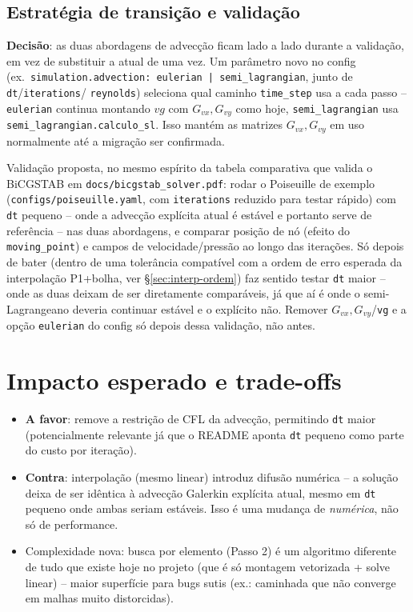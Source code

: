 \documentclass[11pt,a4paper]{article}
\begin{document}
\subsection{Estratégia de transição e validação}
\label{sec:transicao}

\textbf{Decisão}: as duas abordagens de advecção ficam lado a lado
durante a validação, em vez de substituir a atual de uma vez. Um
parâmetro novo no config (ex.\ \texttt{simulation.advection: eulerian
| semi\_lagrangian}, junto de \texttt{dt}/\texttt{iterations}/
\texttt{reynolds}) seleciona qual caminho \texttt{time\_step} usa a
cada passo -- \texttt{eulerian} continua montando $vg$ com $G_{vx},
G_{vy}$ como hoje, \texttt{semi\_lagrangian} usa
\texttt{semi\_lagrangian.calculo\_sl}. Isso mantém as
matrizes $G_{vx}, G_{vy}$ em uso normalmente até a migração ser
confirmada.

Validação proposta, no mesmo espírito da tabela comparativa que
valida o BiCGSTAB em \texttt{docs/bicgstab\_solver.pdf}: rodar o
Poiseuille de exemplo (\texttt{configs/poiseuille.yaml}, com
\texttt{iterations} reduzido para testar rápido) com \texttt{dt}
pequeno -- onde a advecção explícita atual é estável e portanto serve
de referência -- nas duas abordagens, e comparar posição de nó
(efeito do \texttt{moving\_point}) e campos de velocidade/pressão ao
longo das iterações. Só depois de bater (dentro de uma tolerância
compatível com a ordem de erro esperada da interpolação P1+bolha, ver
\S\ref{sec:interp-ordem}) faz sentido testar \texttt{dt} maior -- onde
as duas deixam de ser diretamente comparáveis, já que aí é onde o
semi-Lagrangeano deveria continuar estável e o explícito não. Remover
$G_{vx}, G_{vy}$/\texttt{vg} e a opção \texttt{eulerian} do config só
depois dessa validação, não antes.

\section{Impacto esperado e trade-offs}

\begin{itemize}
  \item \textbf{A favor}: remove a restrição de CFL da advecção,
    permitindo \texttt{dt} maior (potencialmente relevante já que o
    README aponta \texttt{dt} pequeno como parte do custo por
    iteração).
  \item \textbf{Contra}: interpolação (mesmo linear) introduz difusão
    numérica -- a solução deixa de ser idêntica à advecção Galerkin
    explícita atual, mesmo em \texttt{dt} pequeno onde ambas seriam
    estáveis. Isso é uma mudança de \emph{numérica}, não só de
    performance.
  \item Complexidade nova: busca por elemento (Passo 2) é um
    algoritmo diferente de tudo que existe hoje no projeto (que é só
    montagem vetorizada + solve linear) -- maior superfície para
    bugs sutis (ex.: caminhada que não converge em malhas muito
    distorcidas).
\end{itemize}
\end{document}
